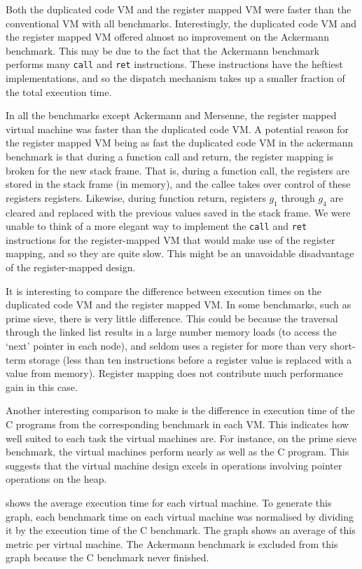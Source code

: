 		Both the duplicated code VM and the register mapped VM were faster than the conventional VM with all benchmarks. Interestingly, the duplicated code VM and the register mapped VM offered almost no improvement on the Ackermann benchmark. This may be due to the fact that the Ackermann benchmark performs many \texttt{call} and \texttt{ret} instructions. These instructions have the heftiest implementations, and so the dispatch mechanism takes up a smaller fraction of the total execution time. 
		
		In all the benchmarks except Ackermann and Mersenne, the register mapped virtual machine was faster than the duplicated code VM. A potential reason for the register mapped VM being as fast the duplicated code VM in the ackermann benchmark is that during a function call and return, the register mapping is broken for the new stack frame. That is, during a function call, the registers are stored in the stack frame (in memory), and the callee takes over control of these registers registers. Likewise, during function return, registers $g_1$ through $g_4$ are cleared and replaced with the previous values saved in the stack frame. We were unable to think of a more elegant way to implement the \texttt{call} and \texttt{ret} instructions for the register-mapped VM that would make use of the register mapping, and so they are quite slow. This might be an unavoidable disadvantage of the register-mapped design.
		
		It is interesting to compare the difference between execution times on the duplicated code VM and the register mapped VM. In some benchmarks, such as prime sieve, there is very little difference. This could be because the traversal through the linked list results in a large number memory loads (to access the `next' pointer in each node), and seldom uses a register for more than very short-term storage (less than ten instructions before a register value is replaced with a value from memory). Register mapping does not contribute much performance gain in this case.
		
		Another interesting comparison to make is the difference in execution time of the C programs from the corresponding benchmark in each VM. This indicates how well suited to each task the virtual machines are. For instance, on the prime sieve benchmark, the virtual machines perform nearly as well as the C program. This suggests that the virtual machine design excels in operations involving pointer operations on the heap.
		
		 shows the average execution time for each virtual machine. To generate this graph, each benchmark time on each virtual machine was normalised by dividing it by the execution time of the C benchmark. The graph shows an average of this metric per virtual machine. The Ackermann benchmark is excluded from this graph because the C benchmark never finished. 
		
